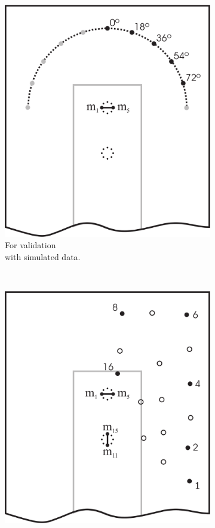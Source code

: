 \documentclass[spanish,openright]{book}
\begin{document}
\begin{figure}
\centering
\begin{subfigure}[t]{0.3\textwidth}
\includegraphics[width=\textwidth]{angular2-short-improved}
\caption{For validation\\with simulated data.}
\label{fig:Simulated_positions}
\end{subfigure}
~\begin{subfigure}[t]{0.3\textwidth}
\includegraphics[width=\textwidth]{positions1-short-improved}

\end{subfigure}
\end{figure}
\end{document}
